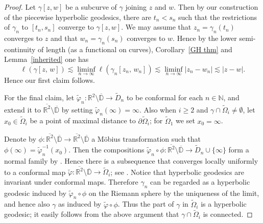 \documentclass[reqno,11pt]{amsart}
\def\wz{\widetilde}
\numberwithin{equation}{section}
\theoremstyle{remark}
\begin{document}
\begin{proof}
Let $\gamma[z,w]$ be a subcurve of $\gamma$ joining $z$ and $w.$
Then by our construction of the piecewise hyperbolic geodesics, there are $t_n<s_n$ such that the restrictions of $\gamma_n$
to $[t_n,s_n]$ converge to $\gamma[z,w].$ We may assume that $z_n=\gamma_n(t_n)$
converges to $z$ and that $w_n=\gamma_n(s_n)$
converges to $w.$ 
Hence by the lower semi-continuity of length 
(as a functional on curves), Corollary~\ref{GH thm} and Lemma~\ref{inherited} 
one has
$$\ell(\gamma[z,\,w])\lesssim \liminf_{n\to \infty} 
\ell(\gamma_n[z_n,\,w_n])\lesssim \liminf_{n\to \infty} |z_n-w_n|\lesssim |z-w|.$$
Hence our first claim follows.

For the final claim, let 
$\wz \varphi_n\colon \mathbb R^2\setminus \overline{\mathbb D}\to \wz D_n$ to be conformal for each $n\in \mathbb N$, 
and extend it to $\overline{\mathbb R^2}\setminus \overline{\mathbb D}$ by setting 
$\wz \varphi_n(\infty)=\infty$. Also when $i\ge 2$ and 
$\gamma\cap \wz\Omega_i\neq\emptyset$, let $x_0\in\wz\Omega_i$ 
be a point of maximal distance to $\partial\wz\Omega_i$; 
for $\wz \Omega_1$ we set $x_0=\infty$. 


Denote by $\phi\colon \overline{\mathbb R^2} \setminus \overline{\mathbb D} 
\to \overline{\mathbb R^2} \setminus \overline{\mathbb D}$ a M\"obius 
transformation such that $\phi(\infty)=\wz\varphi_n^{-1}(x_0)$. Then the 
compositions $\wz \varphi_n\circ \phi\colon \overline{\mathbb R^2} 
\setminus \overline{\mathbb D} \to \wz D_n\cup\{\infty\}$ form  a normal 
family by \cite[Theorem 19.2]{V1971}. Hence there is a subsequence  that
converges locally uniformly to a conformal map 
$\wz \varphi\colon \overline{\mathbb R^2} \setminus \overline{\mathbb D} \to 
\wz \Omega_i$; see \cite[Theorem 21.1]{V1971}. 
Notice that hyperbolic geodesics are invariant under conformal maps. 
Therefore $\gamma_n$ can be regarded as a hyperbolic geodesic induced by 
$\wz \varphi_n\circ \phi$ on the Riemann sphere by the uniqueness of the limit, and hence also $\gamma$ as 
induced by $\wz\varphi\circ \phi$. Thus the part of $\gamma$ in 
$\wz \Omega_i$ is a hyperbolic geodesic; it easily follows from the above
argument that  $\gamma \cap \wz \Omega_i$ is connected. 
% 
\end{proof}
\end{document}
